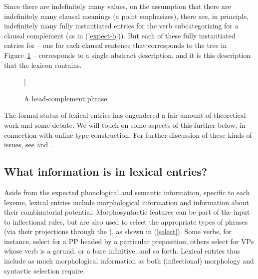 \documentclass[output=paper
	        ,collection
	        ,collectionchapter
 	        ,biblatex
                ,babelshorthands
                ,newtxmath
                ,draftmode
                ,colorlinks, citecolor=brown
]{langscibook}
\begin{document}
Since there are indefinitely many  values, on the assumption that there are indefinitely many clausal meanings (a point \citealt[8--9]{Jackendoff1990} emphasizes), there are, in principle, indefinitely many fully instantiated entries for the verb  subcategorizing for a clausal complement (as in (\ref{expect-b})). 
But each of these fully instantiated entries for  -- one for each clausal sentence that corresponds to the tree in Figure~\ref{expect-b-tree} -- corresponds to a single abstract description, and it is this description that the lexicon contains. 

\begin{figure}
	\begin{forest}
	[ [{\avmtmp{[comps & < \1 >]}} ] 
	[{\avmtmp{[synsem & \1 ]}} ] ]
\end{forest}	
\caption{\label{expect-b-tree} A head-complement phrase}
\end{figure}


The formal status of lexical entries has engendered a fair amount of theoretical work and some debate.
We will touch on some aspects of this further below, in connection with online type construction.
For further discussion of these kinds of issues, see  and .

\subsection{What information is in lexical entries?}

Aside from the expected phonological and semantic information, specific to each lexeme, lexical entries include morphological information and information about their combinatorial potential. Morphosyntactic features can be part of the input to inflectional rules, but are also used to select the appropriate types of phrases (via their projections through the ), as shown in (\ref{select}). Some verbs, for instance, select for a PP headed by a particular preposition; others select for VPs whose verb is a gerund, or a bare infinitive, and so forth. Lexical entries thus include as much morphological information as both (inflectional) morphology and syntactic selection require.
\end{document}
